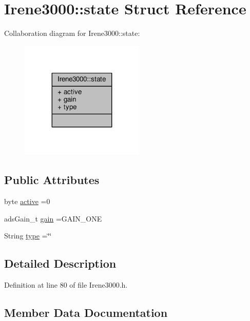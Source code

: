 \hypertarget{structIrene3000_1_1state}{}\section{Irene3000\+:\+:state Struct Reference}
\label{structIrene3000_1_1state}


Collaboration diagram for Irene3000\+:\+:state\+:\nopagebreak
\begin{figure}[H]
\begin{center}
\leavevmode
\includegraphics[width=167pt]{structIrene3000_1_1state__coll__graph}
\end{center}
\end{figure}
\subsection*{Public Attributes}
\begin{DoxyCompactItemize}
\item 
byte \hyperlink{structIrene3000_1_1state_af7ff649f20b9a2fb6ca0f949ee9a25ce}{active} =0
\item 
ads\+Gain\+\_\+t \hyperlink{structIrene3000_1_1state_a1ecf69d38cb31ecaf6b3602a3f3e93cb}{gain} =G\+A\+I\+N\+\_\+\+O\+NE
\item 
String \hyperlink{structIrene3000_1_1state_a9897a7e02727db6351d44006eec73799}{type} =\char`\"{}\char`\"{}
\end{DoxyCompactItemize}


\subsection{Detailed Description}


Definition at line 80 of file Irene3000.\+h.



\subsection{Member Data Documentation}
\mbox{\label{structIrene3000_1_1state_af7ff649f20b9a2fb6ca0f949ee9a25ce}} 
